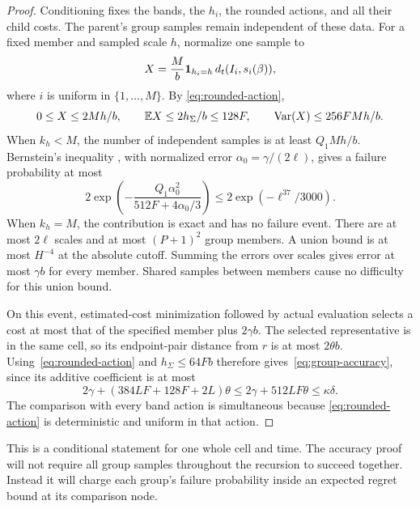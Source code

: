 \begin{proof}
Conditioning fixes the bands, the $h_i$, the rounded actions, and all
their child costs.  The parent's group samples remain independent of
these data.  For a fixed member and sampled scale $h$, normalize one
sample to
\[
 X=\frac Mb\boldsymbol 1_{h_i=h}\,d_t(I_i,s_i(\beta)),
\]
where $i$ is uniform in $\{1,\ldots,M\}$.  By
\eqref{eq:rounded-action},
\[
 0\le X\le2Mh/b,
 \qquad \mathbb E X\le2h_\Sigma/b\le128F,
 \qquad \operatorname{Var}(X)\le256FMh/b.
\]
When $k_h<M$, the number of independent samples is at least
$Q_1Mh/b$.  Bernstein's inequality
\cite[Theorem~4.16]{Tropp2021Probability}, with normalized error
$\alpha_0=\gamma/(2\ell)$, gives a failure probability at most
\[
 2\exp\left(-\frac{Q_1\alpha_0^2}{512F+4\alpha_0/3}\right)
 \le2\exp(-\ell^{37}/3000).
\]
When $k_h=M$, the contribution is exact and has no failure event.
There are at most $2\ell$ scales and at most $(P+1)^2$ group members.
A union bound is at most $H^{-4}$ at the absolute cutoff.  Summing
the errors over scales gives error at most $\gamma b$ for every
member.  Shared samples between members cause no difficulty for this
union bound.

On this event, estimated-cost minimization followed by actual
evaluation selects a cost at most that of the specified member plus
$2\gamma b$.  The selected representative is in the same cell, so
its endpoint-pair distance from $r$ is at most $2\theta b$.
Using~\eqref{eq:rounded-action} and $h_\Sigma\le64Fb$ therefore
gives~\eqref{eq:group-accuracy}, since its additive coefficient is
at most
\[
 2\gamma+(384LF+128F+2L)\theta
 \le2\gamma+512LF\theta\le\kappa\delta.
\]
The comparison with every band action is simultaneous because
\eqref{eq:rounded-action} is deterministic and uniform in that
action.
\end{proof}

This is a conditional statement for one whole cell and time.  The
accuracy proof will not require all group samples throughout the
recursion to succeed together.  Instead it will charge each group's
failure probability inside an expected regret bound at its comparison
node.
